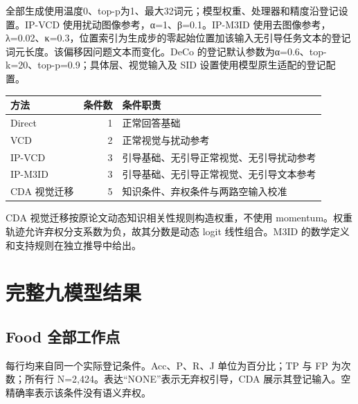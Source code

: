 全部生成使用温度0、top-p为1、最大32词元；模型权重、处理器和精度沿登记设置。IP-VCD 使用扰动图像参考，α=1、β=0.1。IP-M3ID 使用去图像参考，λ=0.02、κ=0.3，位置索引为生成步的零起始位置加该输入无引导任务文本的登记词元长度。该偏移因问题文本而变化。DeCo 的登记默认参数为α=0.6、top-k=20、top-p=0.9；具体层、视觉输入及 SID 设置使用模型原生适配的登记配置。

\begin{longtable}[]{@{}lrl@{}}
\toprule\noalign{}
方法 & 条件数 & 条件职责 \\
\midrule\noalign{}
\endhead
\bottomrule\noalign{}
\endlastfoot
Direct & 1 & 正常回答基础 \\
VCD & 2 & 正常视觉与扰动参考 \\
IP-VCD & 3 & 引导基础、无引导正常视觉、无引导扰动参考 \\
IP-M3ID & 3 & 引导基础、无引导正常视觉、无引导文本参考 \\
CDA 视觉迁移 & 5 & 知识条件、弃权条件与两路空输入校准 \\
\end{longtable}

CDA 视觉迁移按原论文动态知识相关性规则构造权重，不使用 momentum。权重轨迹允许弃权分支系数为负，故其分数是动态 logit 线性组合。M3ID 的数学定义和支持规则在独立推导中给出。

\section{完整九模型结果}\label{ux5b8cux6574ux4e5dux6a21ux578bux7ed3ux679c}

\subsection{Food 全部工作点}\label{food-ux5168ux90e8ux5de5ux4f5cux70b9}

每行均来自同一个实际登记条件。Acc、P、R、J 单位为百分比；TP 与 FP 为次数；所有行 N=2,424。表达``NONE''表示无弃权引导，CDA 展示其登记输入。空精确率表示该条件没有语义弃权。

